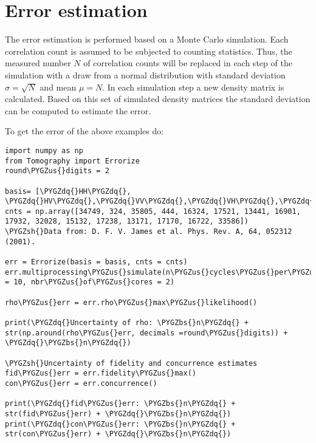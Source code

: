 \documentclass[letterpaper,10pt,english]{sphinxmanual}
\def\PYGZbs{\char`\\}
\def\PYGZus{\char`\_}
\def\PYGZsh{\char`\#}
\def\PYGZdq{\char`\"}
\begin{document}
\section{Error estimation}
\label{intro:error-estimation}
The error estimation is performed based on a Monte Carlo simulation. Each correlation count is assumed to be subjected to counting statistics. Thus, the measured number \(N\) of correlation counts will be replaced in each step of the simulation with a draw from a normal distribution with standard deviation \(\sigma=\sqrt{N}\) and mean \(\mu=N\).
In each simulation step a new density matrix is calculated.
Based on this set of simulated density matrices the standard deviation can be computed to estimate the error.

To get the error of the above examples do:

\begin{Verbatim}[commandchars=\\\{\}]
import numpy as np
from Tomography import Errorize
round\PYGZus{}digits = 2

basis= [\PYGZdq{}HH\PYGZdq{}, \PYGZdq{}HV\PYGZdq{},\PYGZdq{}VV\PYGZdq{},\PYGZdq{}VH\PYGZdq{},\PYGZdq{}RH\PYGZdq{},\PYGZdq{}RV\PYGZdq{},\PYGZdq{}DV\PYGZdq{},\PYGZdq{}DH\PYGZdq{},\PYGZdq{}DR\PYGZdq{},\PYGZdq{}DD\PYGZdq{},\PYGZdq{}RD\PYGZdq{},\PYGZdq{}HD\PYGZdq{},\PYGZdq{}VD\PYGZdq{},\PYGZdq{}VL\PYGZdq{},\PYGZdq{}HL\PYGZdq{},\PYGZdq{}RL\PYGZdq{}]
cnts = np.array([34749, 324, 35805, 444, 16324, 17521, 13441, 16901, 17932, 32028, 15132, 17238, 13171, 17170, 16722, 33586])
\PYGZsh{}Data from: D. F. V. James et al. Phys. Rev. A, 64, 052312 (2001).

err = Errorize(basis = basis, cnts = cnts)
err.multiprocessing\PYGZus{}simulate(n\PYGZus{}cycles\PYGZus{}per\PYGZus{}core  = 10, nbr\PYGZus{}of\PYGZus{}cores = 2)

rho\PYGZus{}err = err.rho\PYGZus{}max\PYGZus{}likelihood()

print(\PYGZdq{}Uncertainty of rho: \PYGZbs{}n\PYGZdq{} + str(np.around(rho\PYGZus{}err, decimals =round\PYGZus{}digits)) + \PYGZdq{}\PYGZbs{}n\PYGZdq{})

\PYGZsh{}Uncertainty of fidelity and concurrence estimates
fid\PYGZus{}err = err.fidelity\PYGZus{}max()
con\PYGZus{}err = err.concurrence()

print(\PYGZdq{}fid\PYGZus{}err: \PYGZbs{}n\PYGZdq{} + str(fid\PYGZus{}err) + \PYGZdq{}\PYGZbs{}n\PYGZdq{})
print(\PYGZdq{}con\PYGZus{}err: \PYGZbs{}n\PYGZdq{} + str(con\PYGZus{}err) + \PYGZdq{}\PYGZbs{}n\PYGZdq{})
\end{Verbatim}
\end{document}
